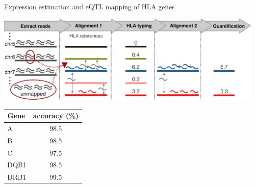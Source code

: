 \documentclass[10pt]{beamer}
\begin{document}
\begin{frame}{Expression estimation and eQTL mapping of HLA genes}
  \centering
  \begin{minipage}{0.6\textwidth}
  \includegraphics[width=\textwidth]{./Figures/method.png}
  \end{minipage}
  \hspace{5pt}
  \begin{tiny}
  \begin{tabular}{lc}
    \hline
    Gene & accuracy (\%) \\
    \hline
    A & 98.5  \\
    B & 98.5  \\
    C & 97.5  \\
    DQB1 & 98.5  \\
    DRB1 & 99.5  \\
    \hline
  \end{tabular}
  \end{tiny}
  \vfill


\end{frame}
\end{document}
